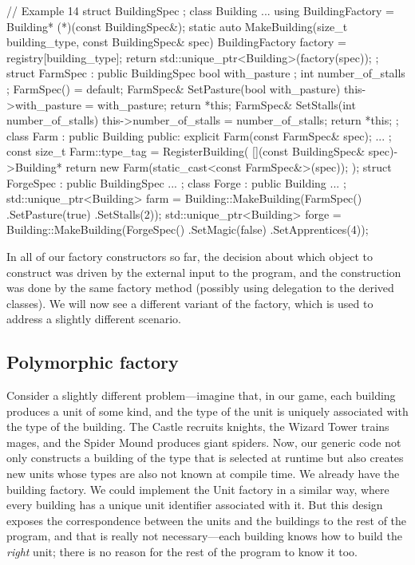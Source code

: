 \begin{code}
// Example 14
struct BuildingSpec {};
class Building {
  ...
  using BuildingFactory =
    Building* (*)(const BuildingSpec&);
  static auto MakeBuilding(size_t building_type,
                           const BuildingSpec& spec) {
    BuildingFactory factory = registry[building_type];
    return std::unique_ptr<Building>(factory(spec));
  }
};
struct FarmSpec : public BuildingSpec {
  bool with_pasture {};
  int number_of_stalls {};
  FarmSpec() = default;
  FarmSpec& SetPasture(bool with_pasture) {
    this->with_pasture = with_pasture;
    return *this;
  }
  FarmSpec& SetStalls(int number_of_stalls) {
    this->number_of_stalls = number_of_stalls;
    return *this;
  }
};
class Farm : public Building {
  public:
  explicit Farm(const FarmSpec& spec);
  ...
};
const size_t Farm::type_tag = RegisterBuilding(
  [](const BuildingSpec& spec)->Building* {
    return new Farm(static_cast<const FarmSpec&>(spec));
  });
struct ForgeSpec : public BuildingSpec { ... };
class Forge : public Building { ... };
std::unique_ptr<Building> farm =
  Building::MakeBuilding(FarmSpec()
                         .SetPasture(true)
                         .SetStalls(2));
std::unique_ptr<Building> forge =
  Building::MakeBuilding(ForgeSpec()
                         .SetMagic(false)
                         .SetApprentices(4));
\end{code}

In all of our factory constructors so far, the decision about which object to construct was driven by the external input to the program, and the construction was done by the same factory method (possibly using delegation to the derived classes). We will now see a different variant of the factory, which is used to address a slightly different scenario.

\subsection{Polymorphic factory}

Consider a slightly different problem---imagine that, in our game, each building produces a unit of some kind, and the type of the unit is uniquely associated with the type of the building. The Castle recruits knights, the Wizard Tower trains mages, and the Spider Mound produces giant spiders. Now, our generic code not only constructs a building of the type that is selected at runtime but also creates new units whose types are also not known at compile time. We already have the building factory. We could implement the Unit factory in a similar way, where every building has a unique unit identifier associated with it. But this design exposes the correspondence between the units and the buildings to the rest of the program, and that is really not necessary---each building knows how to build the \emph{right} unit; there is no reason for the rest of the program to know it too.

